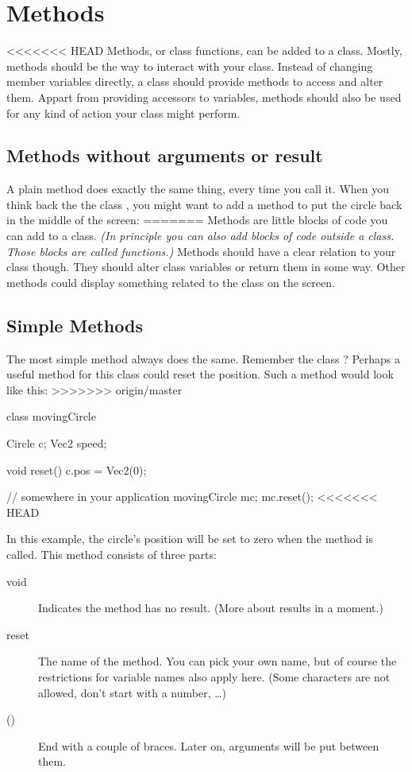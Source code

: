 \chapter{Methods}

<<<<<<< HEAD
Methods, or class functions, can be added to a class. Mostly, methods should be the way to interact with your class. Instead of changing member variables directly, a class should provide methods to access and alter them. Appart from providing accessors to variables, methods should also be used for any kind of action your class might perform. 

\section{Methods without arguments or result}

A plain method does exactly the same thing, every time you call it. When you think back the the class , you might want to add a method to put the circle back in the middle of the screen:
=======
Methods are little blocks of code you can add to a class. \textit{(In principle you can also add blocks of code outside a class. Those blocks are called functions.)} Methods should have a clear relation to your class though. They should alter class variables or return them in some way. Other methods could display something related to the class on the screen.

\section{Simple Methods}

The most simple method always does the same. Remember the class ? Perhaps a useful method for this class could reset the position. Such a method would look like this:
>>>>>>> origin/master

\begin{code}
class movingCircle {
  Circle c;
  Vec2 speed;
  
  void reset() {
    c.pos = Vec2(0);
  }
}

// somewhere in your application
movingCircle mc;
mc.reset();
<<<<<<< HEAD

\end{code}

In this example, the circle's position will be set to zero when the  method is called. This method consists of three parts:

\begin{description}
\item[void] Indicates the method has no result. (More about results in a moment.)
\item[reset] The name of the method. You can pick your own name, but of course the restrictions for variable names also apply here. (Some characters are not allowed, don't start with a number, \ldots)
\item[()] End with a couple of braces. Later on, arguments will be put between them.
\end{description}

